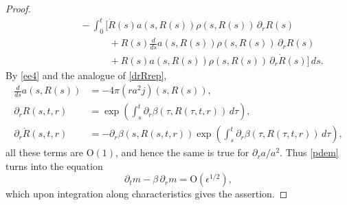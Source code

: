 \documentclass[11pt]{article}
\begin{document}
\begin{proof}
\begin{align*}
    &
    \qquad\quad\quad{}
    - \int_0^t \biggl[\dot R(s) a(s,R(s)) \rho (s,R(s))\, \partial_r R(s)\\
    &
    \qquad\qquad\qquad\quad 
    + R(s) \frac{d}{ds} a(s,R(s)) \rho (s,R(s))\, \partial_r R(s)\\
    &
    \qquad\qquad\qquad\quad 
    + R(s) a(s,R(s)) \rho (s,R(s))\, \partial_r \dot R(s)\biggr]\, ds .
  \end{align*}
  By \eqref{ee4} and the analogue of \eqref{drRrep}, 
  \begin{align*}
    \frac{d}{ds} a(s,R(s))
    &=
    -4\pi (r a^2 j)(s,R(s)),\\
    \partial_r R(s,t,r)
    &=
    \exp\left(\int_s^t \partial_r \beta(\tau,R(\tau,t,r))\,d\tau\right),\\
    \partial_r \dot R(s,t,r)
    &=
    - \partial_r \beta(s,R(s,t,r))
    \exp\left(\int_s^t \partial_r \beta(\tau,R(\tau,t,r))\,d\tau\right),
  \end{align*}
  all these terms are $\mathrm{O}(1)$,
  and hence the same is true for $\partial_r a/a^2$.
  Thus \eqref{pdem} turns into the equation
  \[
  \partial_t m -\beta\,\partial_r m = \mathrm{O}(\epsilon^{1/2}),
  \]
  which upon integration along characteristics gives the assertion.
\end{proof}
\end{document}
